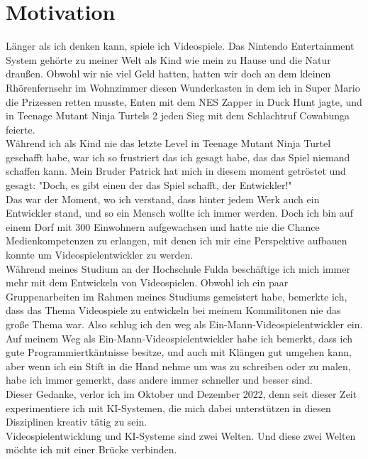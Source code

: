 \section{Motivation}
Länger als ich denken kann, spiele ich Videospiele. Das Nintendo Entertainment System gehörte zu meiner Welt als Kind wie mein zu Hause und die Natur draußen. Obwohl wir nie viel Geld hatten, hatten wir doch an dem kleinen Rhörenfernsehr im Wohnzimmer diesen Wunderkasten in dem ich in Super Mario die Prizessen retten musste, Enten mit dem NES Zapper in Duck Hunt jagte, und in Teenage Mutant Ninja Turtels 2 jeden Sieg mit dem Schlachtruf Cowabunga feierte.
\\
Während ich als Kind nie das letzte Level in Teenage Mutant Ninja Turtel geschafft habe, war ich so frustriert das ich gesagt habe, das das Spiel niemand schaffen kann. Mein Bruder Patrick hat mich in diesem moment getröstet und gesagt: "Doch, es gibt einen der das Spiel schafft, der Entwickler!"
\\
Das war der Moment, wo ich verstand, dass hinter jedem Werk auch ein Entwickler stand, und so ein Mensch wollte ich immer werden. Doch ich bin auf einem Dorf mit 300 Einwohnern aufgewachsen und hatte nie die Chance Medienkompetenzen zu erlangen, mit denen ich mir eine Perspektive aufbauen konnte um Videospielentwickler zu werden.
\\
Während meines Studium an der Hochschule Fulda beschäftige ich mich immer mehr mit dem Entwickeln von Videospielen. Obwohl ich ein paar Gruppenarbeiten im Rahmen meines Studiums gemeistert habe, bemerkte ich, dass das Thema Videospiele zu entwickeln bei meinem Kommilitonen nie das große Thema war. Also schlug ich den weg als Ein-Mann-Videospielentwickler ein.
\\
Auf meinem Weg als Ein-Mann-Videospielentwickler habe ich bemerkt, dass ich gute Programmiertkäntnisse besitze, und auch mit Klängen gut umgehen kann, aber wenn ich ein Stift in die Hand nehme um was zu schreiben oder zu malen, habe ich immer gemerkt, dass andere immer schneller und besser sind.
\\
Dieser Gedanke, verlor ich im Oktober und Dezember 2022, denn seit dieser Zeit experimentiere ich mit KI-Systemen, die mich dabei unterstützen in diesen Disziplinen kreativ tätig zu sein.
\\
Videospielentwicklung und KI-Systeme sind zwei Welten. Und diese zwei Welten möchte ich mit einer Brücke verbinden.
\\
